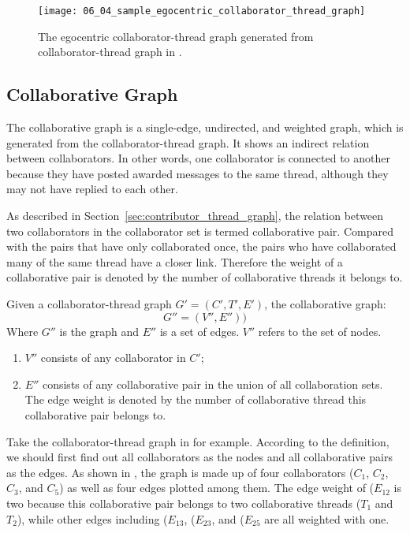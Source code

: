 \begin{figure}[!htb]
  \centering
  \texttt{[image: 06\_04\_sample\_egocentric\_collaborator\_thread\_graph]}
  \caption{The egocentric collaborator-thread graph generated from collaborator-thread graph in .}
  \label{Figure:06_04}
\end{figure}

\subsection{Collaborative Graph}

The collaborative graph is a single-edge, undirected, and weighted graph, which is generated from the collaborator-thread graph. It shows an indirect relation between collaborators. In other words, one collaborator is connected to another because they have posted awarded messages to the same thread, although they may not have replied to each other.

As described in Section~\ref{sec:contributor_thread_graph}, the relation between two collaborators in the collaborator set is termed collaborative pair. Compared with the pairs that have only collaborated once, the pairs who have collaborated many of the same thread have a closer link. Therefore the weight of a collaborative pair is denoted by the number of collaborative threads it belongs to.

Given a collaborator-thread graph \(G'=(C', T', E')\), the collaborative graph:
\[G''=(V'', E''))\]
Where \(G''\) is the graph and \(E''\) is a set of edges. \(V''\) refers to the set of nodes.

\begin{enumerate}
	\item \(V''\) consists of any collaborator in \(C'\); \\
	\item \(E''\) consists of any collaborative pair in the union of all collaboration sets. The edge weight is denoted by the number of collaborative thread this collaborative pair belongs to.
\end{enumerate}

Take the collaborator-thread graph in  for example. According to the definition, we should first find out all collaborators as the nodes and all collaborative pairs as the edges. As shown in , the graph is made up of four collaborators (\(C_{1}\), \(C_{2}\), \(C_{3}\), and \(C_{5}\)) as well as four edges plotted among them. The edge weight of (\(E_{12}\) is two because this collaborative pair belongs to two collaborative threads (\(T_{1}\) and \(T_{2}\)), while other edges including (\(E_{13}\), (\(E_{23}\), and (\(E_{25}\) are all weighted with one.


